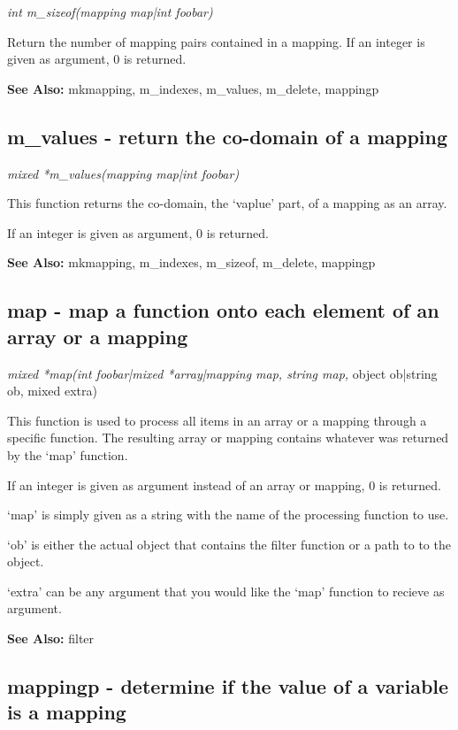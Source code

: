     {\em int m\_sizeof(mapping map|int foobar)}

    Return the number of mapping pairs contained in a mapping.
    If an integer is given as argument, 0 is returned.

    {\bf See Also: }    mkmapping, m\_indexes, m\_values, m\_delete, mappingp



\subsection{m\_values - return the co-domain of a mapping}

    {\em mixed *m\_values(mapping map|int foobar)}

    This function returns the co-domain, the `vaplue' part, of a mapping
    as an array. 

    If an integer is given as argument, 0 is returned. 

    {\bf See Also: }    mkmapping, m\_indexes, m\_sizeof, m\_delete, mappingp


\subsection{map - map a function onto each element of an array or a mapping}

    {\em mixed *map(int foobar|mixed *array|mapping map, string map,}
             object ob|string ob, mixed extra)

    This function is used to process all items in an array or a mapping
    through a specific function. The resulting array or mapping contains
    whatever was returned by the `map' function.

    If an integer is given as argument instead of an array or mapping,
    0 is returned.

    `map' is simply given as a string with the name of the processing
    function to use.

    `ob' is either the actual object that contains the filter function
    or a path to to the object.

    `extra' can be any argument that you would like the `map' 
    function to recieve as argument.

    {\bf See Also: }    filter



\subsection{mappingp - determine if the value of a variable is a mapping}

